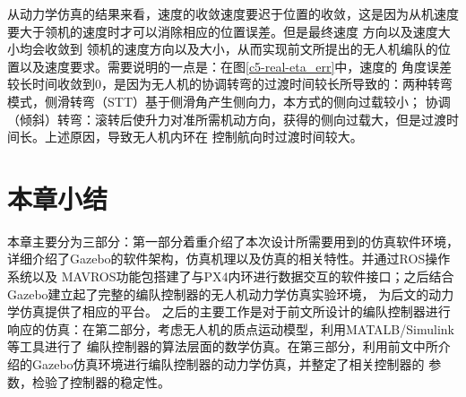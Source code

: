 从动力学仿真的结果来看，速度的收敛速度要迟于位置的收敛，这是因为从机速度要大于领机的速度时才可以消除相应的位置误差。但是最终速度
方向以及速度大小均会收敛到
领机的速度方向以及大小，从而实现前文所提出的无人机编队的位置以及速度要求。需要说明的一点是：在图\ref{c5-real-eta_err}中，速度的
角度误差较长时间收敛到0，是因为无人机的协调转弯的过渡时间较长所导致的：两种转弯模式，侧滑转弯（STT）基于侧滑角产生侧向力，本方式的侧向过载较小；
协调（倾斜）转弯：滚转后使升力对准所需机动方向，获得的侧向过载大，但是过渡时间长。\cite{YuJianQiao2010}上述原因，导致无人机内环在
控制航向时过渡时间较大。
\section{本章小结}
本章主要分为三部分：第一部分着重介绍了本次设计所需要用到的仿真软件环境，详细介绍了Gazebo的软件架构，仿真机理以及仿真的相关特性。并通过ROS操作系统以及
MAVROS功能包搭建了与PX4内环进行数据交互的软件接口；之后结合Gazebo建立起了完整的编队控制器的无人机动力学仿真实验环境，
为后文的动力学仿真提供了相应的平台。
之后的主要工作是对于前文所设计的编队控制器进行响应的仿真：在第二部分，考虑无人机的质点运动模型，利用MATALB/Simulink等工具进行了
编队控制器的算法层面的数学仿真。在第三部分，利用前文中所介绍的Gazebo仿真环境进行编队控制器的动力学仿真，并整定了相关控制器的
参数，检验了控制器的稳定性。
